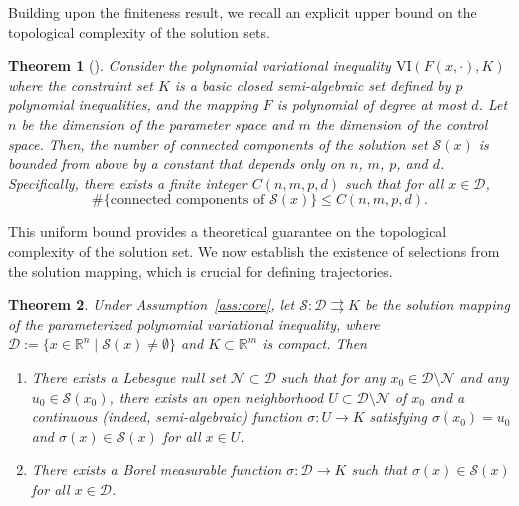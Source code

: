 \documentclass[sn-basic,Numbered]{sn-jnl}
\theoremstyle{thmstyleone}%
\newtheorem{theorem}{Theorem}%
\begin{document}
Building upon the finiteness result, we recall an explicit upper bound on the topological complexity of the solution sets.

\begin{theorem}[\cite{Hieu2019}]\label{thm:connected_components_bound}
Consider the polynomial variational inequality $\mathrm{VI}(F(x,\cdot), K)$ where the constraint set $K$ is a basic closed semi-algebraic set defined by $p$ polynomial inequalities, and the mapping $F$ is polynomial of degree at most $d$. Let $n$ be the dimension of the parameter space and $m$ the dimension of the control space. Then, the number of connected components of the solution set $\mathcal{S}(x)$ is bounded from above by a constant that depends only on $n$, $m$, $p$, and $d$. Specifically, there exists a finite integer $C(n, m, p, d)$ such that for all $x \in \mathcal{D}$,
\[ 
\#\{\text{connected components of } \mathcal{S}(x)\} \leq C(n, m, p, d). 
\]
\end{theorem}

This uniform bound provides a theoretical guarantee on the topological complexity of the solution set. We now establish the existence of selections from the solution mapping, which is crucial for defining trajectories.

\begin{theorem} \label{thm:selection}
Under Assumption~\ref{ass:core}, let $\mathcal{S}: \mathcal{D} \rightrightarrows K$ be the solution mapping of the parameterized polynomial variational inequality, where $\mathcal{D} := \{x \in \mathbb{R}^n \mid \mathcal{S}(x) \neq \emptyset\}$ and $K \subset \mathbb{R}^m$ is compact. Then
\begin{enumerate}
    \item There exists a Lebesgue null set $\mathcal{N} \subset \mathcal{D}$ such that for any $x_0 \in \mathcal{D} \setminus \mathcal{N}$ and any $u_0 \in \mathcal{S}(x_0)$, there exists an open neighborhood $U \subset \mathcal{D} \setminus \mathcal{N}$ of $x_0$ and a continuous (indeed, semi-algebraic) function $\sigma: U \to K$ satisfying $\sigma(x_0) = u_0$ and $\sigma(x) \in \mathcal{S}(x)$ for all $x \in U$.
    \item There exists a Borel measurable function $\sigma: \mathcal{D} \to K$ such that $\sigma(x) \in \mathcal{S}(x)$ for all $x \in \mathcal{D}$.
\end{enumerate}
\end{theorem}
\end{document}
